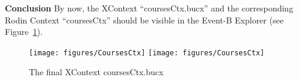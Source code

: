 \textbf{Conclusion} By now, the XContext ``coursesCtx.bucx'' and the corresponding Rodin Context ``coursesCtx'' should be visible in the Event-B Explorer (see Figure~\ref{fig:CoursesCtx}). 
  \begin{figure}[!htbp]
    \centering
    \texttt{[image: figures/CoursesCtx]}
    \else
    \texttt{[image: figures/CoursesCtx]}
    \endif
    \caption{The final XContext coursesCtx.bucx}
    \label{fig:CoursesCtx}
  \end{figure}





